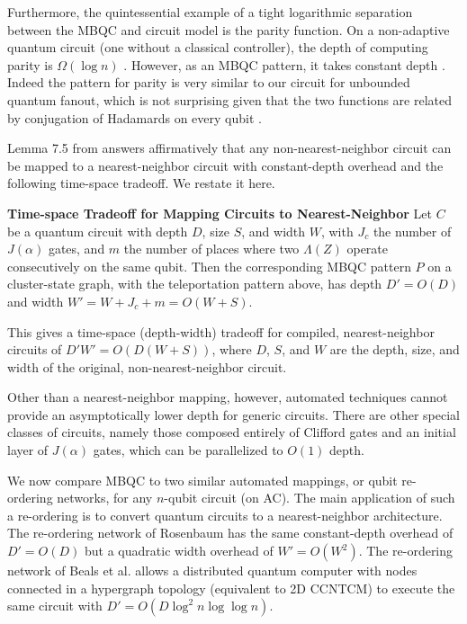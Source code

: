 Furthermore, the quintessential example of a tight logarithmic separation
between the MBQC and circuit model is the parity function.
On a non-adaptive quantum circuit (one without a classical controller),
the depth of computing parity is $\Omega(\log n)$ \cite{Fang2003}.
However, as an MBQC pattern, it takes constant depth \cite{Broadbent2007}.
Indeed the pattern for parity is very similar to our circuit for unbounded
quantum fanout, which is not surprising given that the two functions are
related by conjugation of Hadamards on every qubit \cite{Moore1999}.

Lemma 7.5 from \cite{Broadbent2007} answers affirmatively that any
non-nearest-neighbor circuit can be mapped to a nearest-neighbor
circuit with constant-depth overhead and the following time-space tradeoff.
We restate it here.

\begin{proposition}{\textbf{Time-space Tradeoff for Mapping Circuits to Nearest-Neighbor} \cite{Broadbent2007}}
Let $C$ be a quantum circuit with depth $D$, size $S$, and width $W$, with $J_c$ the number
of $J(\alpha)$ gates, and $m$ the number of places where two $\Lambda(Z)$ operate
consecutively on the same qubit. Then the corresponding MBQC pattern $P$
on a cluster-state graph, with the teleportation pattern above, has depth
$D' = O(D)$ and width $W' = W + J_c + m = O(W+S)$.
\label{prop:ts-mbqc}
\end{proposition}

This gives a time-space (depth-width) tradeoff for compiled,
nearest-neighbor circuits of $D'W' = O(D(W+S))$, where $D$, $S$, and $W$
are the depth, size, and width of the original, non-nearest-neighbor circuit.

Other than a nearest-neighbor mapping, however, automated techniques cannot
provide an asymptotically lower depth for generic circuits.
There are other special classes of circuits, namely those composed entirely of
Clifford gates and an initial layer of $J(\alpha)$ gates, which can be
parallelized to $O(1)$ depth.

We now compare MBQC to two similar automated mappings, or qubit re-ordering networks,
for any $n$-qubit circuit (on \textsf{AC}).
The main application of such a re-ordering is to convert quantum circuits
to a nearest-neighbor architecture. The re-ordering network of Rosenbaum
\cite{Rosenbaum2012} has the same constant-depth overhead of $D' = O(D)$
but a quadratic width overhead of $W' = O(W^2)$.
The re-ordering network of Beals et al. \cite{Beals2012} allows
a distributed quantum computer with nodes connected in a hypergraph
topology
(equivalent to \textsf{2D CCNTCM}) to execute the same circuit with
$D' = O(D\log^2n\log\log n)$.

